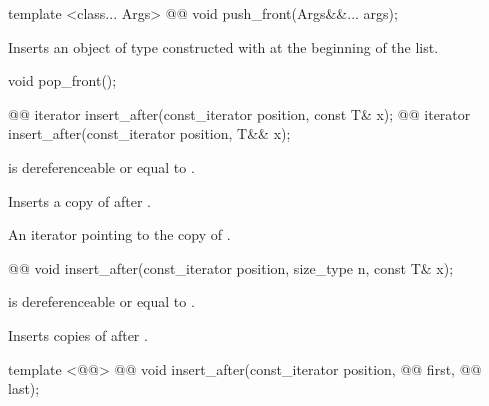 \documentclass[american,twoside]{book}
\begin{document}
\begin{itemdecl}
template <class... Args> 
  @@ 
  void push_front(Args&&... args);
\end{itemdecl}

\begin{itemdescr}
\pnum
\effects Inserts an object of type  constructed with  at the beginning of the list.
\end{itemdescr}

\begin{itemdecl}
void pop_front();
\end{itemdecl}

\begin{itemdescr}
\pnum
\effects {}
\end{itemdescr}

\begin{itemdecl}
@@ iterator insert_after(const_iterator position, const T& x);
@@ iterator insert_after(const_iterator position, T&& x);
\end{itemdecl}

\begin{itemdescr}
\pnum
\requires {} is dereferenceable or equal to .

\pnum
\effects Inserts a copy of  after .

\pnum
\returns An iterator pointing to the copy of .
\end{itemdescr}

\begin{itemdecl}
@@ 
  void insert_after(const_iterator position, size_type n, const T& x);
\end{itemdecl}

\begin{itemdescr}
\pnum
\requires {} is dereferenceable or equal to .

\pnum
\effects Inserts  copies of  after .
\end{itemdescr}

\begin{itemdecl}
template <@@> 
  @@
  void insert_after(const_iterator position, @@ first, @@ last);
\end{itemdecl}
\end{document}
